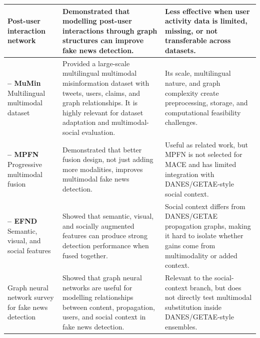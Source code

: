 {\begin{longtable}{
>{\raggedright\arraybackslash}p{}
>{\raggedright\arraybackslash}p{}
>{\raggedright\arraybackslash}p{}
}
\midrule

\textbf{\citet{Min2022}} \newline
Post-user interaction network
&
Demonstrated that modelling post-user interactions through graph structures can improve fake news detection.
&
Less effective when user activity data is limited, missing, or not transferable across datasets. \\

\midrule

\textbf{\citet{mumindataset} -- MuMin} \newline
Multilingual multimodal dataset
&
Provided a large-scale multilingual multimodal misinformation dataset with tweets, users, claims, and graph relationships. It is highly relevant for dataset adaptation and multimodal-social evaluation.
&
Its scale, multilingual nature, and graph complexity create preprocessing, storage, and computational feasibility challenges. \\

\midrule

\textbf{\citet{Jing2023} -- MPFN} \newline
Progressive multimodal fusion
&
Demonstrated that better fusion design, not just adding more modalities, improves multimodal fake news detection.
&
Useful as related work, but MPFN is not selected for MACE and has limited integration with DANES/GETAE-style social context. \\

\midrule

\textbf{\citet{Nadeem2023} -- EFND} \newline
Semantic, visual, and social features
&
Showed that semantic, visual, and socially augmented features can produce strong detection performance when fused together.
&
Social context differs from DANES/GETAE propagation graphs, making it hard to isolate whether gains come from multimodality or added context. \\

\midrule

\textbf{\citet{phan2023graphsurvey}} \newline
Graph neural network survey for fake news detection
&
Showed that graph neural networks are useful for modelling relationships between content, propagation, users, and social context in fake news detection.
&
Relevant to the social-context branch, but does not directly test multimodal substitution inside DANES/GETAE-style ensembles. \\


\end{longtable}}
